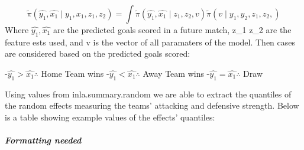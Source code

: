 \documentclass[
]{article}
\begin{document}
\[\tilde{\pi}(\hat{y_1} ,\hat{x_1} \mid y_1 , x_1, z_1, z_2) = \int \tilde{\pi}(\hat{y_1} ,\hat{x_1} \mid z_1 ,z_2,v)  \tilde{\pi}(v \mid y_1 , y_2,  z_1 ,z_2,)\]
Where \(\hat{y_1} ,\hat{x_1}\) are the predicted goals scored in a
future match, z\_1 z\_2 are the feature ests used, and v is the vector
of all paramaters of the model. Then cases are considered based on the
predicted goals scored:

-\(\hat{y_1} > \hat{x_1} \therefore\) Home Team wins
-\(\hat{y_1} < \hat{x_1} \therefore\) Away Team wins
-\(\hat{y_1} = \hat{x_1} \therefore\) Draw

\pagebreak

Using values from inla.summary.random we are able to extract the
quantiles of the random effects measuring the teams' attacking and
defensive strength. Below is a table showing example values of the
effects' quantiles:

\hypertarget{formatting-needed}{%
\subparagraph{Formatting needed}\label{formatting-needed}}
\end{document}

